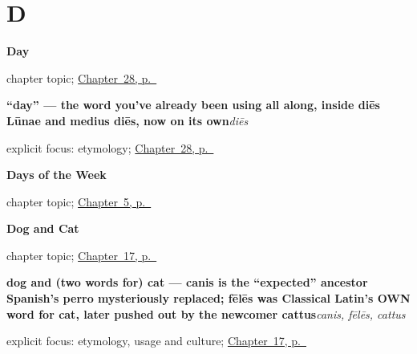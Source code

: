 \section*{D}

\noindent\begin{minipage}[t]{\linewidth}
\raggedright
\textbf{Day}\par
\footnotesize chapter topic; \hyperref[ch:la-day]{Chapter~28, p.~\pageref*{ch:la-day}}
\end{minipage}\par\smallskip

\noindent\begin{minipage}[t]{\linewidth}
\raggedright
\textbf{\textquotedblleft{}day\textquotedblright{} — the word you've already been using all along, inside diēs Lūnae and medius diēs, now on its own}\enspace\emph{diēs}\par
\footnotesize explicit focus: etymology; \hyperref[ch:la-day]{Chapter~28, p.~\pageref*{ch:la-day}}
\end{minipage}\par\smallskip

\noindent\begin{minipage}[t]{\linewidth}
\raggedright
\textbf{Days of the Week}\par
\footnotesize chapter topic; \hyperref[ch:la-days-of-the-week]{Chapter~5, p.~\pageref*{ch:la-days-of-the-week}}
\end{minipage}\par\smallskip

\noindent\begin{minipage}[t]{\linewidth}
\raggedright
\textbf{Dog and Cat}\par
\footnotesize chapter topic; \hyperref[ch:la-dog-and-cat]{Chapter~17, p.~\pageref*{ch:la-dog-and-cat}}
\end{minipage}\par\smallskip

\noindent\begin{minipage}[t]{\linewidth}
\raggedright
\textbf{dog and (two words for) cat — canis is the \textquotedblleft{}expected\textquotedblright{} ancestor Spanish's perro mysteriously replaced; fēlēs was Classical Latin's OWN word for cat, later pushed out by the newcomer cattus}\enspace\emph{canis, fēlēs, cattus}\par
\footnotesize explicit focus: etymology, usage and culture; \hyperref[ch:la-dog-and-cat]{Chapter~17, p.~\pageref*{ch:la-dog-and-cat}}
\end{minipage}\par\smallskip

